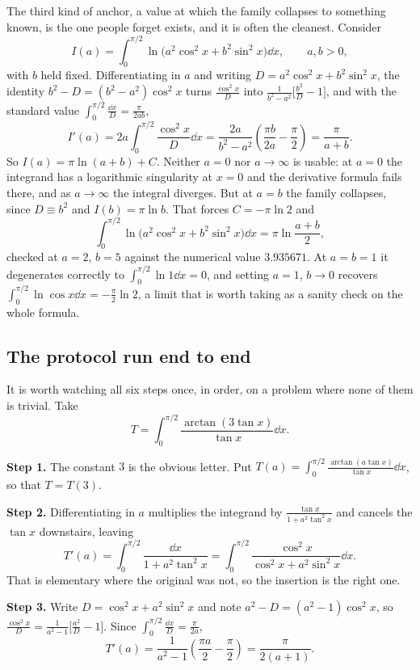 The third kind of anchor, a value at which the family collapses to something known, is the one people forget exists, and it is often the cleanest. Consider
\[I(a)=\int_0^{\pi/2}\ln\bigl(a^{2}\cos^{2}x+b^{2}\sin^{2}x\bigr)\dd x,\qquad a,b>0,\]
with $b$ held fixed. Differentiating in $a$ and writing $D=a^{2}\cos^{2}x+b^{2}\sin^{2}x$, the identity $b^{2}-D=(b^{2}-a^{2})\cos^{2}x$ turns $\frac{\cos^{2}x}{D}$ into $\frac{1}{b^{2}-a^{2}}\bigl[\frac{b^{2}}{D}-1\bigr]$, and with the standard value $\int_0^{\pi/2}\frac{\dd x}{D}=\frac{\pi}{2ab}$,
\[I'(a)=2a\int_0^{\pi/2}\frac{\cos^{2}x}{D}\dd x=\frac{2a}{b^{2}-a^{2}}\left(\frac{\pi b}{2a}-\frac{\pi}{2}\right)=\frac{\pi}{a+b}.\]
So $I(a)=\pi\ln(a+b)+C$. Neither $a=0$ nor $a\to\infty$ is usable: at $a=0$ the integrand has a logarithmic singularity at $x=0$ and the derivative formula fails there, and as $a\to\infty$ the integral diverges. But at $a=b$ the family collapses, since $D\equiv b^{2}$ and $I(b)=\pi\ln b$. That forces $C=-\pi\ln2$ and
\[\int_0^{\pi/2}\ln\bigl(a^{2}\cos^{2}x+b^{2}\sin^{2}x\bigr)\dd x=\pi\ln\frac{a+b}{2},\]
checked at $a=2$, $b=5$ against the numerical value $3.935671$. At $a=b=1$ it degenerates correctly to $\int_0^{\pi/2}\ln1\dd x=0$, and setting $a=1$, $b\to0$ recovers $\int_0^{\pi/2}\ln\cos x\dd x=-\tfrac{\pi}{2}\ln2$, a limit that is worth taking as a sanity check on the whole formula.

\subsection{The protocol run end to end}

It is worth watching all six steps once, in order, on a problem where none of them is trivial. Take
\[T=\int_0^{\pi/2}\frac{\arctan(3\tan x)}{\tan x}\dd x.\]

\textbf{Step 1.} The constant $3$ is the obvious letter. Put $T(a)=\int_0^{\pi/2}\frac{\arctan(a\tan x)}{\tan x}\dd x$, so that $T=T(3)$.

\textbf{Step 2.} Differentiating in $a$ multiplies the integrand by $\frac{\tan x}{1+a^{2}\tan^{2}x}$ and cancels the $\tan x$ downstairs, leaving
\[T'(a)=\int_0^{\pi/2}\frac{\dd x}{1+a^{2}\tan^{2}x}=\int_0^{\pi/2}\frac{\cos^{2}x}{\cos^{2}x+a^{2}\sin^{2}x}\dd x.\]
That is elementary where the original was not, so the insertion is the right one.

\textbf{Step 3.} Write $D=\cos^{2}x+a^{2}\sin^{2}x$ and note $a^{2}-D=(a^{2}-1)\cos^{2}x$, so $\frac{\cos^{2}x}{D}=\frac{1}{a^{2}-1}\bigl[\frac{a^{2}}{D}-1\bigr]$. Since $\int_0^{\pi/2}\frac{\dd x}{D}=\frac{\pi}{2a}$,
\[T'(a)=\frac{1}{a^{2}-1}\left(\frac{\pi a}{2}-\frac{\pi}{2}\right)=\frac{\pi}{2(a+1)}.\]

